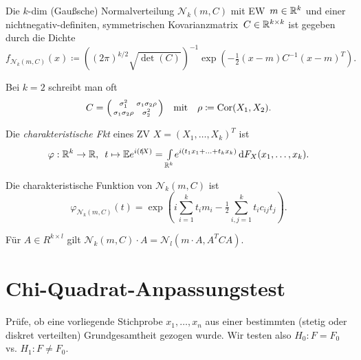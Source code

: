 \documentclass{cheat-sheet}
\newcommand{\E}{\mathbb{E}} %
\newcommand{\scp}[2]{\left( #1 \!\mid\! #2 \right)} %
\DeclareMathOperator{\cor}{Cor} %
\newcommand{\Normal}{\mathcal{N}} %
\begin{document}

\begin{defn}
  Die $k$-dim (Gaußsche) Normalverteilung $\Normal_k(m, C)$ mit EW~$m \in \mathbb{R}^k$ und einer nichtnegativ-definiten, symmetrischen Kovarianzmatrix~$C \in \mathbb{R}^{k \times k}$ ist gegeben durch die Dichte
  \[ f_{\Normal_k(m, C)}(x) \coloneqq \left( (2\pi)^{k/2} \sqrt{\det(C)} \right)^{-1} \exp \left( - \tfrac{1}{2} (x-m) C^{-1} (x-m)^T \right). \]
\end{defn}

\begin{bem}
  Bei $k=2$ schreibt man oft
  \[
    C = \begin{psmallmatrix}
      \sigma_1^2 & \sigma_1 \sigma_2 \rho \\
      \sigma_1 \sigma_2 \rho & \sigma_2^2
    \end{psmallmatrix}
    \quad \text{mit} \quad
    \rho \coloneqq \cor(X_1, X_2).
  \]
\end{bem}

\begin{defn}
  Die \emph{charakteristische Fkt} eines ZV $X = (X_1, \ldots, X_k)^T$ ist
  \[
    \varphi : \R^k \to \R, \enspace
    t \mapsto \E e^{i \scp{t}{X}} = \Int{\R^k}{}{e^{i (t_1 x_1 + \ldots + t_k x_k)}}{F_X(x_1, \ldots, x_k)}.
  \]
\end{defn}

\begin{bem}
  Die charakteristische Funktion von $\Normal_k(m, C)$ ist
  \[ \varphi_{\Normal_k(m, C)}(t) = \exp \left( i \sum_{i=1}^k t_i m_i - \tfrac{1}{2} \sum_{i,j=1}^k t_i c_{ij} t_j \right). \]
\end{bem}

\begin{satz}
  Für $A \in R^{k \times l}$ gilt $\Normal_k(m, C) \cdot A = \Normal_l(m \cdot A, A^T C A)$.
\end{satz}


\section{Chi-Quadrat-Anpassungstest}


\begin{aufgabe}
  Prüfe, ob eine vorliegende Stichprobe $x_1, \ldots, x_n$ aus einer bestimmten (stetig oder diskret verteilten) Grundgesamtheit gezogen wurde. Wir testen also $H_0 : F = F_0$ vs. $H_1 : F \neq F_0$.
\end{aufgabe}
\end{document}
